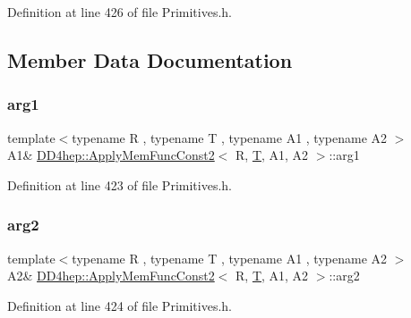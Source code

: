 Definition at line 426 of file Primitives.\+h.



\subsection{Member Data Documentation}
\hypertarget{struct_d_d4hep_1_1_apply_mem_func_const2_a5017a4de9fd2e68ad5c13d34ffd7c19d}{}\label{struct_d_d4hep_1_1_apply_mem_func_const2_a5017a4de9fd2e68ad5c13d34ffd7c19d} 
\subsubsection{\texorpdfstring{arg1}{arg1}}
{\footnotesize\ttfamily template$<$typename R , typename T , typename A1 , typename A2 $>$ \\
A1\& \hyperlink{struct_d_d4hep_1_1_apply_mem_func_const2}{D\+D4hep\+::\+Apply\+Mem\+Func\+Const2}$<$ R, \hyperlink{class_t}{T}, A1, A2 $>$\+::arg1}



Definition at line 423 of file Primitives.\+h.

\hypertarget{struct_d_d4hep_1_1_apply_mem_func_const2_a96f3779267c92dcb4ff855fd360f62d5}{}\label{struct_d_d4hep_1_1_apply_mem_func_const2_a96f3779267c92dcb4ff855fd360f62d5} 
\subsubsection{\texorpdfstring{arg2}{arg2}}
{\footnotesize\ttfamily template$<$typename R , typename T , typename A1 , typename A2 $>$ \\
A2\& \hyperlink{struct_d_d4hep_1_1_apply_mem_func_const2}{D\+D4hep\+::\+Apply\+Mem\+Func\+Const2}$<$ R, \hyperlink{class_t}{T}, A1, A2 $>$\+::arg2}



Definition at line 424 of file Primitives.\+h.

\hypertarget{struct_d_d4hep_1_1_apply_mem_func_const2_a9a9dc912d8f9b572a684ebe92aa0af6d}{}\label{struct_d_d4hep_1_1_apply_mem_func_const2_a9a9dc912d8f9b572a684ebe92aa0af6d} 
